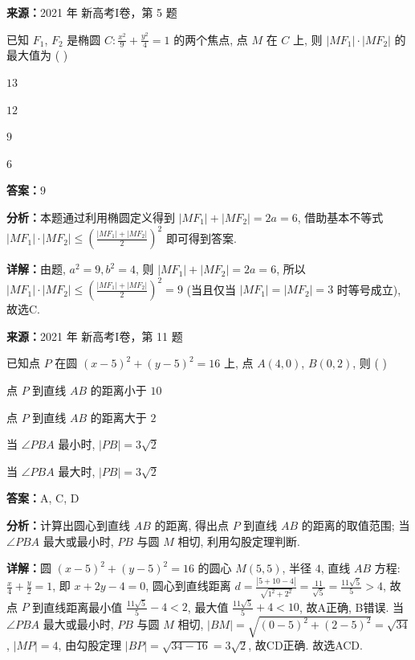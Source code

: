 \begin{question}[points=5]
\textbf{来源：}2021 年 新高考I卷，第 5 题\par
已知 $F_1$, $F_2$ 是椭圆 $C: \frac{x^2}{9} + \frac{y^2}{4} = 1$ 的两个焦点, 点 $M$ 在 $C$ 上, 则 $|MF_1| \cdot |MF_2|$ 的最大值为 ( )
\begin{choices}
  \item $13$
  \item $12$
  \item $9$
  \item $6$
\end{choices}
\begin{solution}
\textbf{答案：}$9$

\textbf{分析：}本题通过利用椭圆定义得到 $|MF_1| + |MF_2| = 2a = 6$, 借助基本不等式 $|MF_1| \cdot |MF_2| \leq \left(\frac{|MF_1| + |MF_2|}{2}\right)^2$ 即可得到答案.

\textbf{详解：}由题, $a^2 = 9, b^2 = 4$, 则 $|MF_1| + |MF_2| = 2a = 6$, 所以 $|MF_1| \cdot |MF_2| \leq \left(\frac{|MF_1| + |MF_2|}{2}\right)^2 = 9$ (当且仅当 $|MF_1| = |MF_2| = 3$ 时等号成立), 故选C.
\end{solution}
\end{question}

\begin{question}[points=5]
\textbf{来源：}2021 年 新高考I卷，第 11 题\par
已知点 $P$ 在圆 $(x-5)^2 + (y-5)^2 = 16$ 上, 点 $A(4,0)$, $B(0,2)$, 则 ( )
\begin{choices}
  \item 点 $P$ 到直线 $AB$ 的距离小于 $10$
  \item 点 $P$ 到直线 $AB$ 的距离大于 $2$
  \item 当 $\angle PBA$ 最小时, $|PB| = 3\sqrt{2}$
  \item 当 $\angle PBA$ 最大时, $|PB| = 3\sqrt{2}$
\end{choices}
\begin{solution}
\textbf{答案：}A, C, D

\textbf{分析：}计算出圆心到直线 $AB$ 的距离, 得出点 $P$ 到直线 $AB$ 的距离的取值范围; 当 $\angle PBA$ 最大或最小时, $PB$ 与圆 $M$ 相切, 利用勾股定理判断.

\textbf{详解：}圆 $(x-5)^2+(y-5)^2=16$ 的圆心 $M(5,5)$, 半径 $4$, 直线 $AB$ 方程: $\frac{x}{4}+\frac{y}{2}=1$, 即 $x+2y-4=0$, 圆心到直线距离 $d = \frac{|5+10-4|}{\sqrt{1^2+2^2}} = \frac{11}{\sqrt{5}} = \frac{11\sqrt{5}}{5} > 4$, 故点 $P$ 到直线距离最小值 $\frac{11\sqrt{5}}{5} - 4 < 2$, 最大值 $\frac{11\sqrt{5}}{5} + 4 < 10$, 故A正确, B错误. 当 $\angle PBA$ 最大或最小时, $PB$ 与圆 $M$ 相切, $|BM| = \sqrt{(0-5)^2+(2-5)^2} = \sqrt{34}$, $|MP| = 4$, 由勾股定理 $|BP| = \sqrt{34-16} = 3\sqrt{2}$, 故CD正确. 故选ACD.
\end{solution}
\end{question}

